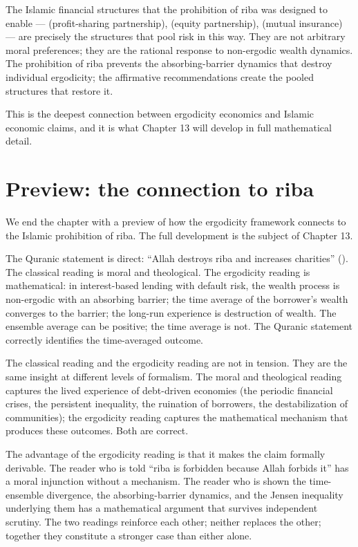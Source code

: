 The Islamic financial structures that the prohibition of riba was
designed to enable ---  (profit-sharing partnership),
 (equity partnership),  (mutual
insurance) --- are precisely the structures that pool risk in this
way. They are not arbitrary moral preferences; they are the rational
response to non-ergodic wealth dynamics. The prohibition of riba
prevents the absorbing-barrier dynamics that destroy individual
ergodicity; the affirmative recommendations create the pooled
structures that restore it.

This is the deepest connection between ergodicity economics and
Islamic economic claims, and it is what Chapter 13 will develop in
full mathematical detail.

\section{Preview: the connection to riba}
\label{sec:riba-preview}

We end the chapter with a preview of how the ergodicity framework
connects to the Islamic prohibition of riba. The full development is
the subject of Chapter 13.

The Quranic statement is direct: ``Allah destroys riba and increases
charities'' (). The classical reading is moral and
theological. The ergodicity reading is mathematical: in
interest-based lending with default risk, the wealth process is
non-ergodic with an absorbing barrier; the time average of the
borrower's wealth converges to the barrier; the long-run experience
is destruction of wealth. The ensemble average can be positive;
the time average is not. The Quranic statement correctly identifies
the time-averaged outcome.

The classical reading and the ergodicity reading are not in tension.
They are the same insight at different levels of formalism. The
moral and theological reading captures the lived experience of
debt-driven economies (the periodic financial crises, the persistent
inequality, the ruination of borrowers, the destabilization of
communities); the ergodicity reading captures the mathematical
mechanism that produces these outcomes. Both are correct.

The advantage of the ergodicity reading is that it makes the claim
formally derivable. The reader who is told ``riba is forbidden
because Allah forbids it'' has a moral injunction without a
mechanism. The reader who is shown the time-ensemble divergence,
the absorbing-barrier dynamics, and the Jensen inequality
underlying them has a mathematical argument that survives independent
scrutiny. The two readings reinforce each other; neither replaces
the other; together they constitute a stronger case than either
alone.

